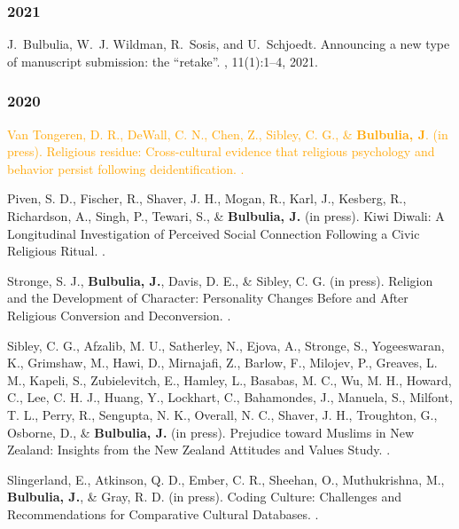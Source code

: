 \documentclass{article}
\begin{document}
\begin{thebibliography}{99}

\subsubsection*{2021}
J.~Bulbulia, W.~J. Wildman, R.~Sosis, and U.~Schjoedt.
\newblock Announcing a new type of manuscript submission: the ``retake''.
, 11(1):1--4, 2021.




\subsubsection*{2020}

 \textcolor{Orange}{Van Tongeren, D. R., DeWall, C. N., Chen, Z., Sibley, C. G., \& {\bf Bulbulia, J}. (in press). 
\newblock Religious residue: Cross-cultural evidence that religious psychology and behavior persist following deidentification. 
.}


 Piven, S. D., Fischer, R., Shaver, J. H., Mogan, R., Karl, J., Kesberg, R., Richardson, A., Singh, P., Tewari, S., \& {\bf Bulbulia, J.} (in press).
\newblock Kiwi Diwali: A Longitudinal Investigation of Perceived Social Connection Following a Civic Religious Ritual.
.

 Stronge, S. J., {\bf Bulbulia, J.}, Davis, D. E., \& Sibley, C. G. (in press). 
\newblock Religion and the Development of Character: Personality Changes Before and After Religious Conversion and Deconversion. 
.


 Sibley, C. G., Afzalib, M. U., Satherley, N., Ejova, A., Stronge, S., Yogeeswaran, K., Grimshaw, M., Hawi, D., Mirnajafi, Z., Barlow, F., Milojev, P., Greaves, L. M., Kapeli, S., Zubielevitch, E., Hamley, L., Basabas, M. C., Wu, M. H., Howard, C., Lee, C. H. J., Huang, Y., Lockhart, C., Bahamondes, J., Manuela, S., Milfont, T. L., Perry, R., Sengupta, N. K., Overall, N. C., Shaver, J. H., Troughton, G., Osborne, D., \& {\bf Bulbulia, J.} (in press). 
\newblock Prejudice toward Muslims in New Zealand: Insights from the New Zealand Attitudes and Values Study.
.


 Slingerland, E., Atkinson, Q. D., Ember, C. R., Sheehan, O., Muthukrishna, M., {\bf Bulbulia, J.}, \& Gray, R. D. (in press). 
\newblock Coding Culture: Challenges and Recommendations for Comparative Cultural Databases.
. 



\end{thebibliography}
\end{document}
